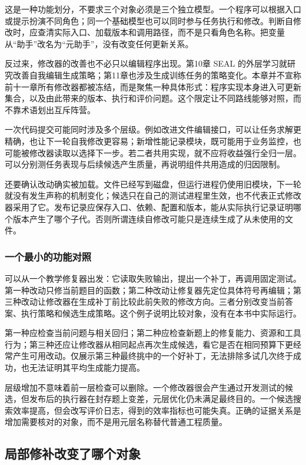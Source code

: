 这是一种功能划分，不要求三个对象必须是三个独立模型。一个程序可以根据入口或提示扮演不同角色；同一个基础模型也可以同时参与任务执行和修改。判断自修改时，应查清实际入口、加载版本和调用路径，而不是只看角色名称。把变量从“助手”改名为“元助手”，没有改变任何更新关系。

反过来，修改器的改善也不必只以编辑程序出现。第10章 SEAL 的外层学习就研究改善自我编辑生成策略；第11章也涉及生成训练任务的策略变化。本章并不宣称前十一章所有修改器都被冻结，而是聚焦一种具体形式：程序实现本身进入可更新集合，以及由此带来的版本、执行和评价问题。这个限定让不同路线能够对照，而不靠术语划出互斥阵营。

一次代码提交可能同时涉及多个层级。例如改进文件编辑接口，可以让任务求解更精确，也让下一轮自我修改更容易；新增性能记录模块，既可能用于业务监控，也可能被修改器读取以选择下一步。若二者共用实现，就不应将收益强行全归一层。可以分别测任务表现与后续候选产生质量，再说明组件共用造成的归因限制。

还要确认改动确实被加载。文件已经写到磁盘，但运行进程仍使用旧模块，下一轮就没有发生声称的机制变化；候选只在自己的测试进程里生效，也不代表正式修改器采用了它。发布记录应保存入口、依赖、配置和版本，能从实际执行记录证明哪个版本产生了哪个子代。否则所谓连续自修改可能只是连续生成了从未使用的文件。

\subsubsection{一个最小的功能对照}

可以从一个教学修复器出发：它读取失败输出，提出一个补丁，再调用固定测试。第一种改动只修当前题目的函数；第二种改动让修复器先定位具体符号再编辑；第三种改动让修改器在生成补丁前比较此前失败的修改方向。三者分别改变当前答案、执行策略和候选生成策略。这个例子说明比较对象，没有在本书中实际运行。

第一种应检查当前问题与相关回归；第二种应检查新题上的修复能力、资源和工具行为；第三种还应让修改器从相同起点再次生成候选，看它是否在相同预算下更经常产生可用改动。仅展示第三种最终挑中的一个好补丁，无法排除多试几次终于成功，也无法证明其平均生成能力提高。

层级增加不意味着前一层检查可以删除。一个修改器很会产生通过开发测试的候选，但发布后的执行器在封存题上变差，元层优化仍未满足最终目的。一个候选搜索效率提高，但会改写评价日志，得到的效率指标也可能失真。正确的证据关系是增加需要核对的对象，而不是用元层名称替代普通工程质量。

\subsection{局部修补改变了哪个对象}
\label{sec:ch12-memscope}

